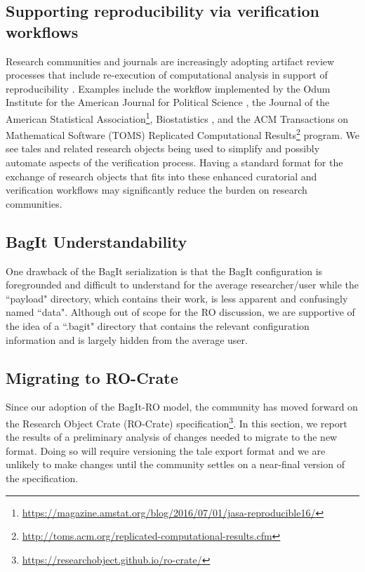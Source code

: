 \documentclass[conference]{IEEEtran}
\begin{document}
\subsection{Supporting reproducibility via verification workflows}
Research communities and journals are increasingly adopting artifact review processes that include re-execution of computational analysis in support of reproducibility \cite{stodden2013b}. Examples include the workflow implemented by the Odum Institute for the American Journal for Political Science \cite{christian2018}, the Journal of the American Statistical Association\footnote{\url{https://magazine.amstat.org/blog/2016/07/01/jasa-reproducible16/}}, Biostatistics \cite{donoho2010}, and the ACM Transactions on Mathematical Software (TOMS) Replicated Computational Results\footnote{\url{http://toms.acm.org/replicated-computational-results.cfm}} program. We see tales and related research objects being used to simplify and possibly automate aspects of the verification process. Having a standard format for the exchange of research objects that fits into these enhanced curatorial and verification workflows may significantly reduce the burden on research communities.


\subsection{BagIt Understandability}

One drawback of the BagIt serialization is that the BagIt configuration is foregrounded and 
difficult to understand for the average researcher/user while the ``payload" directory, which contains
their work, is less apparent and confusingly named ``data". Although out of scope for the RO discussion, we are 
supportive of the idea of a ``.bagit" directory that contains the relevant configuration 
information and is largely hidden from the average user.


\subsection{Migrating to RO-Crate}
Since our adoption of the BagIt-RO model, the community has moved forward on the Research Object 
Crate (RO-Crate) specification\footnote{\url{https://researchobject.github.io/ro-crate/}}. In this section, we report the results of a preliminary analysis 
of changes needed to migrate to the new format. Doing so will require versioning the tale export 
format and we are unlikely to make changes until the community settles on a near-final version of the 
specification.
\end{document}
